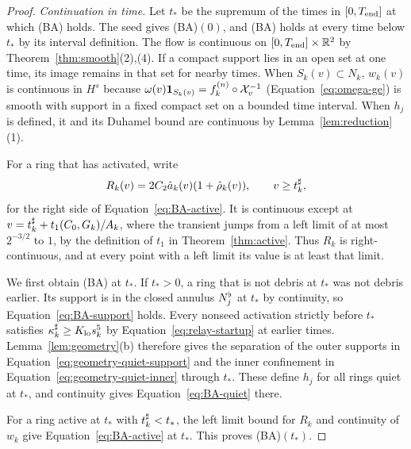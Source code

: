 \begin{proof}
\emph{Continuation in time.}
Let $t_*$ be the supremum of the times in $[0,T_{\mathrm{end}}]$ at which (BA) holds.
The seed gives (BA)$(0)$, and (BA) holds at every time below $t_*$ by its
interval definition. The flow is continuous on $[0,T_{\mathrm{end}}]\times\mathbb{R}^2$ by
Theorem~\ref{thm:smooth}(2),(4). If a compact support lies in an open set at
one time, its image remains in that set for nearby times. When
$S_k(v)\subset N_k$, $w_k(v)$ is continuous in $H^s$ because
$\omega(v)\mathbf 1_{S_k(v)}=f^{(n)}_k\circ\mathcal{X}_v^{-1}$
(Equation~\eqref{eq:omega-ge}) is smooth with support in a fixed compact
set on a bounded time interval. When $h_j$ is defined, it and its Duhamel
bound are continuous by Lemma~\ref{lem:reduction}(1).

For a ring that has activated, write
\begin{equation}
\label{eq:boot-continuation-envelope}
R_k(v)=2C_2\hat a_k(v)(1+\hat\rho_k(v)),\qquad v\ge t^\sharp_k,
\end{equation}
for the right side of Equation~\eqref{eq:BA-active}.
It is continuous except at $v=t^\sharp_k+t_1(C_0,G_k)/A_k$, where the transient
jumps from a left limit of at most $2^{-3/2}$ to $1$, by the definition of
$t_1$ in Theorem~\ref{thm:active}. Thus $R_k$ is right-continuous, and at
every point with a left limit its value is at least that limit.

We first obtain (BA) at $t_*$. If $t_*>0$, a ring that is not debris at
$t_*$ was not debris earlier. Its support is in the closed annulus
$N^{\flat}_j$ at $t_*$ by continuity, so Equation~\eqref{eq:BA-support} holds.
Every nonseed activation strictly before $t_*$ satisfies
$\kappa^\sharp_k\ge K_{\mathrm{lo}} s_k^5$ by Equation~\eqref{eq:relay-startup} at earlier times.
Lemma~\ref{lem:geometry}(b) therefore gives the separation of the outer supports
in Equation~\eqref{eq:geometry-quiet-support} and the inner confinement in
Equation~\eqref{eq:geometry-quiet-inner} through $t_*$. These define $h_j$ for all
rings quiet at $t_*$, and continuity gives Equation~\eqref{eq:BA-quiet} there.

For a ring active at $t_*$ with $t^\sharp_k<t_*$, the left limit bound for
$R_k$ and continuity of $w_k$ give Equation~\eqref{eq:BA-active} at $t_*$.
This proves (BA)$(t_*)$.


\end{proof}
